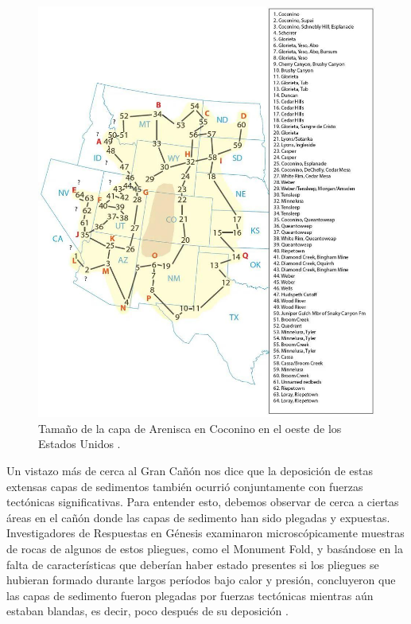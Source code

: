 \documentclass[10pt,twocolumn,letterpaper]{article}
\begin{document}
\begin{figure}[t]
\begin{center}
   \includegraphics[width=1\linewidth]{coconino.jpg}
\end{center}
   \caption{Tamaño de la capa de Arenisca en Coconino en el oeste de los Estados Unidos \cite{21}.}
\label{fig:3}
\label{fig:onecol}
\end{figure}

Un vistazo más de cerca al Gran Cañón nos dice que la deposición de estas extensas capas de sedimentos también ocurrió conjuntamente con fuerzas tectónicas significativas. Para entender esto, debemos observar de cerca a ciertas áreas en el cañón donde las capas de sedimento han sido plegadas y expuestas. Investigadores de Respuestas en Génesis \cite{42} examinaron microscópicamente muestras de rocas de algunos de estos pliegues, como el Monument Fold, y basándose en la falta de características que deberían haber estado presentes si los pliegues se hubieran formado durante largos períodos bajo calor y presión, concluyeron que las capas de sedimento fueron plegadas por fuerzas tectónicas mientras aún estaban blandas, es decir, poco después de su deposición \cite{43}.
\end{document}

